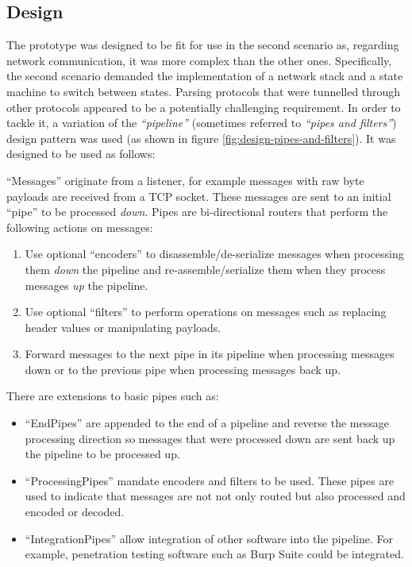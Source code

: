 \subsection{Design}
The prototype was designed to be fit for use in the second scenario as, regarding network communication, it was more complex than the other ones. Specifically, the second scenario demanded the implementation of a network stack and a state machine to switch between states.
Parsing protocols that were tunnelled through other protocols appeared to be a potentially challenging requirement. In order to tackle it, a variation of the \emph{\enquote{pipeline}} (sometimes referred to \emph{\enquote{pipes and filters}}) design pattern was used (as shown in figure \ref{fig:design-pipes-and-filters}). It was designed to be used as follows:\par
\enquote{Messages} originate from a listener, for example messages with raw byte payloads are received from a \ac{TCP} socket. These messages are sent to an initial \enquote{pipe} to be processed \emph{down}.
Pipes are bi-directional routers that perform the following actions on messages:
\begin{enumerate}
    \item Use optional \enquote{encoders} to disassemble/de-serialize messages when processing them \emph{down} the pipeline and re-assemble/serialize them when they process messages \emph{up} the pipeline.
    \item Use optional \enquote{filters} to perform operations on messages such as replacing header values or manipulating payloads.
    \item Forward messages to the next pipe in its pipeline when processing messages down or to the previous pipe when processing messages back up.
\end{enumerate}
There are extensions to basic pipes such as:
\begin{itemize}
    \item \enquote{EndPipes} are appended to the end of a pipeline and reverse the message processing direction so messages that were processed down are sent back up the pipeline to be processed up.
    \item \enquote{ProcessingPipes} mandate encoders and filters to be used. These pipes are used to indicate that messages are not not only routed but also processed and encoded or decoded.
    \item \enquote{IntegrationPipes} allow integration of other software into the pipeline. For example, penetration testing software such as Burp Suite could be integrated.
\end{itemize}


